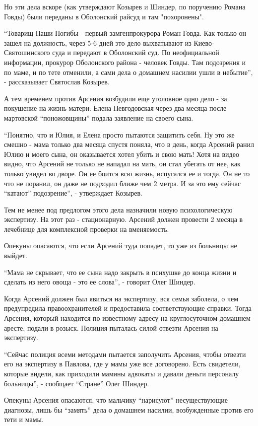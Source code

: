 Но эти дела вскоре (как утверждают Козырев и Шиндер, по поручению Романа Говды)
были переданы в Оболонский райсуд и там "похоронены". 

“Товарищ Паши Погибы - первый замгенпрокурора Роман Говда. Как только он зашел
на должность, через 5-6 дней это дело выхватывают из Киево-Святошинского суда и
передают в Оболонский суд. По неофициальной информации, прокурор Оболонского
района - человек Говды. Там подозрения и по маме, и по тете отменили, а сами
дела о домашнем насилии ушли в небытие”, - рассказывает Святослав Козырев.

А тем временем против Арсения возбудили еще уголовное одно дело - за покушение
на жизнь матери. Елена Невгодовская через два месяца после мартовской
“поножовщины” подала заявление на своего сына.

“Понятно, что и Юлия, и Елена просто пытаются защитить себя. Ну это же смешно -
мама только два месяца спустя поняла, что в день, когда Арсений ранил Юлию и
моего сына, он оказывается хотел убить и свою мать! Хотя на видео видно, что
Арсений не только не нападал на мать, он стал убегать от нее, как только увидел
во дворе. Он ее боится всю жизнь, испугался ее и тогда. Он не то что не
поранил, он даже не подходил ближе чем 2 метра. И за это ему сейчас “катают”
подозрение”, - утверждает Козырев. 

Тем не менее под предлогом этого дела назначили новую психологическую
экспертизу. На этот раз - стационарную. Арсений должен провести 2 месяца в
лечебнице для комплексной проверки на вменяемость. 

Опекуны опасаются, что если Арсений туда попадет, то уже из больницы не выйдет. 

“Мама не скрывает, что ее сына надо закрыть в психушке до конца жизни и сделать
из него овоща - это ее слова”, - говорит Олег Шиндер.

Когда Арсений должен был явиться на экспертизу, вся семья заболела, о чем
предупредила правоохранителей и предоставила соответствующие справки. Тогда
Арсения, который находится по известному адресу на круглосуточном домашнем
аресте, подали в розыск. Полиция пыталась силой отвезти Арсения на экспертизу. 

“Сейчас полиция всеми методами пытается заполучить Арсения, чтобы отвезти его
на экспертизу в Павлова, где у мамы уже все договорено. Есть свидетели, которые
видели, как приходили мамины адвокаты и давали деньги персоналу больницы”, -
сообщает “Стране” Олег Шиндер.  

Опекуны Арсения опасаются, что мальчику “нарисуют” несуществующие диагнозы,
лишь бы “замять” дела о домашнем насилии, возбужденные против его тети и мамы.


